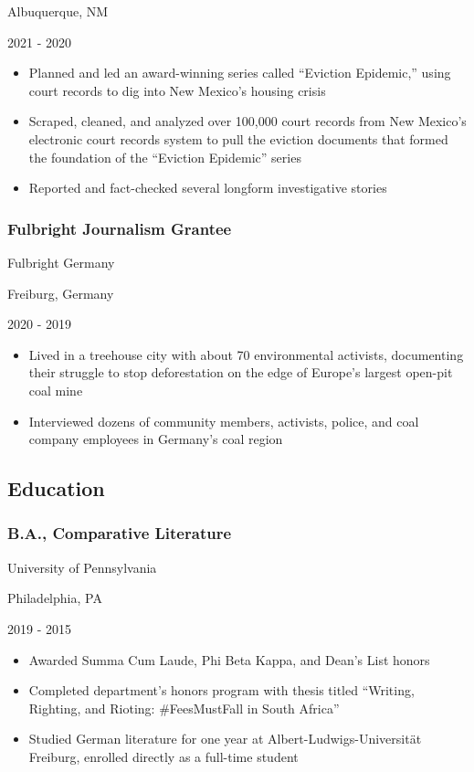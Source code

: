 \documentclass[
]{article}
\providecommand{\tightlist}{%
  \setlength{\itemsep}{0pt}\setlength{\parskip}{0pt}}
\begin{document}
Albuquerque, NM

2021 - 2020

\begin{itemize}
\tightlist
\item
  Planned and led an award-winning series called ``Eviction Epidemic,''
  using court records to dig into New Mexico's housing crisis
\item
  Scraped, cleaned, and analyzed over 100,000 court records from New
  Mexico's electronic court records system to pull the eviction
  documents that formed the foundation of the ``Eviction Epidemic''
  series
\item
  Reported and fact-checked several longform investigative stories
\end{itemize}

\hypertarget{fulbright-journalism-grantee}{%
\subsubsection{Fulbright Journalism
Grantee}\label{fulbright-journalism-grantee}}

Fulbright Germany

Freiburg, Germany

2020 - 2019

\begin{itemize}
\tightlist
\item
  Lived in a treehouse city with about 70 environmental activists,
  documenting their struggle to stop deforestation on the edge of
  Europe's largest open-pit coal mine
\item
  Interviewed dozens of community members, activists, police, and coal
  company employees in Germany's coal region
\end{itemize}

\hypertarget{education}{%
\subsection{Education}\label{education}}

\hypertarget{b.a.-comparative-literature}{%
\subsubsection{B.A., Comparative
Literature}\label{b.a.-comparative-literature}}

University of Pennsylvania

Philadelphia, PA

2019 - 2015

\begin{itemize}
\tightlist
\item
  Awarded Summa Cum Laude, Phi Beta Kappa, and Dean's List honors
\item
  Completed department's honors program with thesis titled ``Writing,
  Righting, and Rioting: \#FeesMustFall in South Africa''
\item
  Studied German literature for one year at Albert-Ludwigs-Universität
  Freiburg, enrolled directly as a full-time student
\end{itemize}
\end{document}
